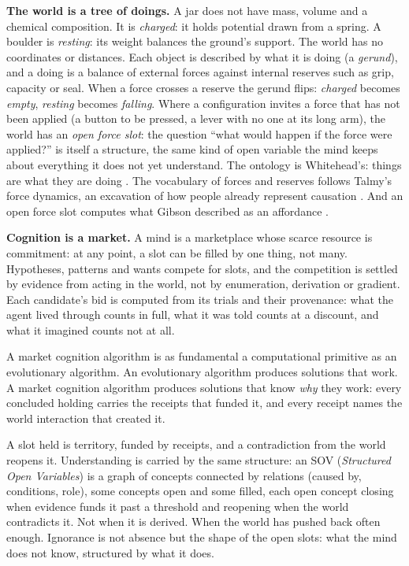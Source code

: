 \documentclass[11pt]{article}
\newcommand{\sov}{\textsc{SOV}}
\theoremstyle{remark}
\begin{document}
\textbf{The world is a tree of doings.} A jar does not have mass, volume and a chemical
composition. It is \emph{charged}: it holds potential drawn from a spring. A boulder is
\emph{resting}: its weight balances the ground's support. The world has no coordinates or
distances. Each object is described by what it is doing (a \emph{gerund}), and a doing is
a balance of external forces against internal reserves such as grip, capacity or seal.
When a force crosses a reserve the gerund flips: \emph{charged} becomes \emph{empty},
\emph{resting} becomes \emph{falling}. Where a configuration invites a force that has not
been applied (a button to be pressed, a lever with no one at its long arm), the world has
an \emph{open force slot}: the question ``what would happen if the force were applied?'' is
itself a structure, the same kind of open variable the mind keeps about everything it does
not yet understand. The ontology is Whitehead's: things are what they are doing
\citep{Whitehead1929}. The vocabulary of forces and reserves follows Talmy's force dynamics,
an excavation of how people already represent causation \citep{Talmy1988}. And an open force
slot computes what Gibson described as an affordance \citep{Gibson2014}.

\textbf{Cognition is a market.} A mind is a marketplace whose scarce resource is
commitment: at any point, a slot can be filled by one thing, not many. Hypotheses,
patterns and wants compete for slots, and the competition is settled by evidence from
acting in the world, not by enumeration, derivation or gradient. Each candidate's bid is
computed from its trials and their provenance: what the agent lived through counts in full,
what it was told counts at a discount, and what it imagined counts not at all.

A market cognition algorithm is as fundamental a computational primitive as an evolutionary
algorithm. An evolutionary algorithm produces solutions that work. A market cognition
algorithm produces solutions that know \emph{why} they work: every concluded holding carries
the receipts that funded it, and every receipt names the world interaction that created it.

A slot held is territory, funded by receipts, and a contradiction from the world reopens
it. Understanding is carried by the same structure: an \sov{} (\emph{Structured Open
Variables}) is a graph of concepts connected by relations (caused by, conditions, role),
some concepts open and some filled, each open concept closing when evidence funds it past
a threshold and reopening when the world contradicts it. Not when it is derived. When the world has pushed
back often enough. Ignorance is not absence but the shape of the open slots: what the mind
does not know, structured by what it does.
\end{document}
